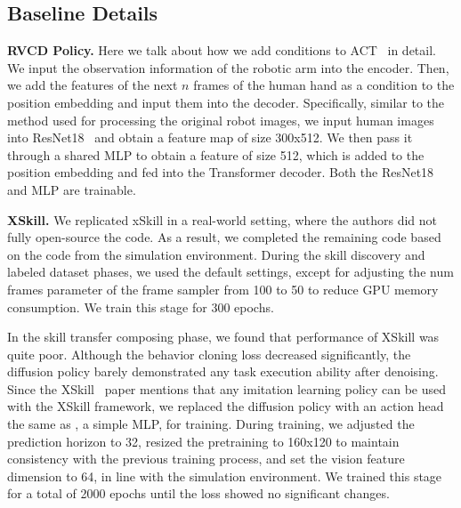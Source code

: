 \subsection{Baseline Details}
\label{supp:baselines}
\noindent\textbf{RVCD Policy.} Here we talk about how we add conditions to ACT~\cite{zhao2023learning} in detail. We input the observation information of the robotic arm into the encoder. Then, we add the features of the next $n$ frames of the human hand as a condition to the position embedding and input them into the decoder. Specifically, similar to the method used for processing the original robot images, we input human images into ResNet18~\cite{he2016deep} and obtain a feature map of size 300x512. We then pass it through a shared MLP to obtain a feature of size 512, which is added to the position embedding and fed into the Transformer decoder. Both the ResNet18~\cite{he2016deep} and MLP are trainable.

\noindent\textbf{XSkill.}
We replicated xSkill in a real-world setting, where the authors did not fully open-source the code. As a result, we completed the remaining code based on the code from the simulation environment. During the skill discovery and labeled dataset phases, we used the default settings, except for adjusting the num frames parameter of the frame sampler from 100 to 50 to reduce GPU memory consumption. We train this stage for 300 epochs.

In the skill transfer composing phase, we found that performance of XSkill was quite poor. Although the behavior cloning loss decreased significantly, the diffusion policy barely demonstrated any task execution ability after denoising. Since the XSkill~\cite{xu2023xskill} paper mentions that any imitation learning policy can be used with the XSkill framework, we replaced the diffusion policy with an action head the same as \system, a simple MLP, for training. During training, we adjusted the prediction horizon to 32, resized the pretraining to 160x120 to maintain consistency with the previous training process, and set the vision feature dimension to 64, in line with the simulation environment. We trained this stage for a total of 2000 epochs until the loss showed no significant changes.